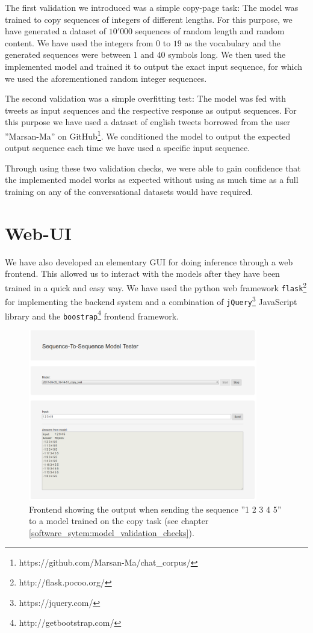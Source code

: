 The first validation we introduced was a simple copy-page task: The model was trained to copy sequences of integers of different lengths. For this purpose, we have generated a dataset of $10'000$ sequences of random length and random content. We have used the integers from $0$ to $19$ as the vocabulary and the generated sequences were between $1$ and $40$ symbols long. We then used the implemented model and trained it to output the exact input sequence, for which we used the aforementioned random integer sequences. 

The second validation was a simple overfitting test: The model was fed with tweets as input sequences and the respective response as output sequences. For this purpose we have used a dataset of english tweets borrowed from the user ''Marsan-Ma'' on GitHub\footnote{https://github.com/Marsan-Ma/chat\_corpus/}. We conditioned the model to output the expected output sequence each time we have used a specific input sequence.

Through using these two validation checks, we were able to gain confidence that the implemented model works as expected without using as much time as a full training on any of the conversational datasets would have required.

\section{Web-UI}
We have also developed an elementary GUI for doing inference through a web frontend. This allowed us to interact with the models after they have been trained in a quick and easy way. We have used the python web framework \texttt{flask}\footnote{http://flask.pocoo.org/} for implementing the backend system and a combination of \texttt{jQuery}\footnote{https://jquery.com/} JavaScript library and the \texttt{boostrap}\footnote{http://getbootstrap.com/} frontend framework.

\begin{figure}[H]
	\centering
	\includegraphics[width=10cm]{img/web_frontend_inference}
	\caption{Frontend showing the output when sending the sequence ''1 2 3 4 5'' to a model trained on the copy task (see chapter \ref{software_sytem:model_validation_checks}).}
\end{figure}

